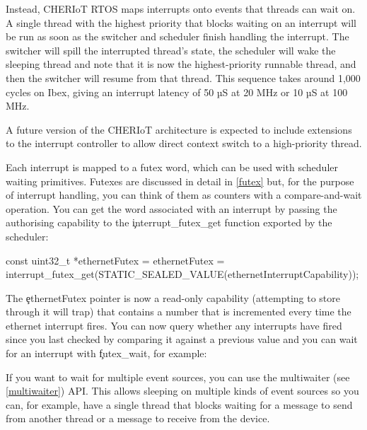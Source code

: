 Instead, CHERIoT RTOS maps interrupts onto events that threads can wait on.
A single thread with the highest priority that blocks waiting on an interrupt will be run as soon as the switcher and scheduler finish handling the interrupt.
The switcher will spill the interrupted thread's state, the scheduler will wake the sleeping thread and note that it is now the highest-priority runnable thread, and then the switcher will resume from that thread.
This sequence takes around 1,000 cycles on Ibex, giving an interrupt latency of 50 µS at 20 MHz or 10 µS at 100 MHz.

\begin{note}
A future version of the CHERIoT architecture is expected to include extensions to the interrupt controller to allow direct context switch to a high-priority thread.
\end{note}

Each interrupt is mapped to a futex word, which can be used with scheduler waiting primitives.
Futexes are discussed in detail in \ref{futex} but, for the purpose of interrupt handling, you can think of them as counters with a compare-and-wait operation.
You can get the word associated with an interrupt by passing the authorising capability to the \c{interrupt_futex_get} function exported by the scheduler:

\begin{cxxsnippet}
const uint32_t *ethernetFutex = ethernetFutex =
	interrupt_futex_get(STATIC_SEALED_VALUE(ethernetInterruptCapability));
\end{cxxsnippet}

The \c{ethernetFutex} pointer is now a read-only capability (attempting to store through it will trap) that contains a number that is incremented every time the ethernet interrupt fires.
You can now query whether any interrupts have fired since you last checked by comparing it against a previous value and you can wait for an interrupt with \c{futex_wait}, for example:

\begin{cxxsnippet}
do
{
    uint32_t last = *ethernetFutex;
    // Handle interrupt here
\} while (futex_wait(ethernetFutex, last) == 0);
\end{cxxsnippet}

If you want to wait for multiple event sources, you can use the multiwaiter (see \ref{multiwaiter}) API.
This allows sleeping on multiple kinds of event sources so you can, for example, have a single thread that blocks waiting for a message to send from another thread or a message to receive from the device.

